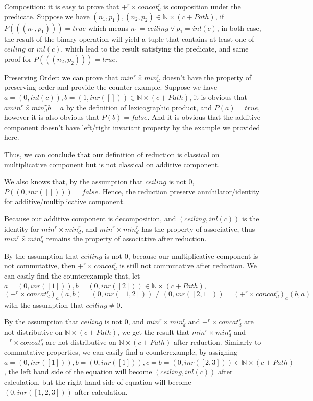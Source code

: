 \documentclass[a4paper,12pt,twoside,openright]{report}
\begin{document}
Composition: it is easy to prove that $+^r \times concat^r_d$ is composition under the predicate. Suppose we have $(n_1,p_1),(n_2,p_2) \in \mathbb{N} \times (c + Path)$, if $P(((n_1,p_1))) = true$ which means $n_1 = ceiling \vee p_1 = inl(c)$, in both case, the result of the binary operation will yield a tuple that contains at least one of $ceiling$ or $inl(c)$, which lead to the result satisfying the predicate, and same proof for $P(((n_2,p_2))) = true$.

Preserving Order: we can prove that $min^r \bar{\times} min^r_d$ doesn't have the property of preserving order and provide the counter example. Suppose we have $a = (0,inl (c)), b = (1,inr([])) \in \mathbb{N} \times (c + Path)$, it is obvious that $ a min^r \bar{\times} min^r_d b = a$ by the definition of lexicographic product, and $P(a) = true$, however it is also obvious that $P(b) = false$. And it is obvious that the additive component doesn't have left/right invariant property by the example we provided here.

Thus, we can conclude that our definition of reduction is classical on multiplicative component but is not classical on additive component.

We also knows that, by the assumption that $ceiling$ is not 0, $P((0,inr([]))) = false$. Hence, the reduction preserve annihilator/identity for additive/multiplicative component.

Because our additive component is decomposition, and $(ceiling,inl (c))$ is the identity for $min^r \bar{\times} min^r_d$, and $min^r \bar{\times} min^r_d$ has the property of associative, thus $min^r \bar{\times} min^r_d$ remains the property of associative after reduction.

By the assumption that $ceiling$ is not 0, because our multiplicative component is not commutative, then $+^r \times concat^r_d$ is still not commutative after reduction. We can easily find the counterexample that, let $a = (0,inr([1])), b = (0,inr([2])) \in \mathbb{N} \times (c + Path)$, 
\[(+^r \times concat^r_d)_a(a,b) = (0,inr([1,2])) \neq (0,inr([2,1])) = (+^r \times concat^r_d)_a(b,a)\] with the assumption that $ceiling \neq 0$.

By the assumption that $ceiling$ is not 0, and $min^r \bar{\times} min^r_d$ and $+^r \times concat^r_d$ are not distributive on $\mathbb{N} \times (c + Path)$, we get the result that $min^r \bar{\times} min^r_d$ and $+^r \times concat^r_d$ are not distributive on $\mathbb{N} \times (c + Path)$ after reduction. Similarly to commutative properties, we can easily find a counterexample, by assigning $a = (0,inr([1])), b = (0,inr([1])), c = b = (0,inr([2,3])) \in \mathbb{N} \times (c + Path)$, the left hand side of the equation will become $(ceiling,inl (c))$ after calculation, but the right hand side of equation will become $(0,inr([1,2,3]))$ after calculation.
\end{document}
